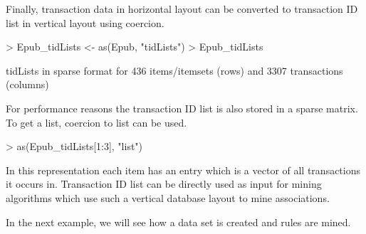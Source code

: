 \documentclass[10pt,a4paper]{article}
\newcommand{\class}[1]{\textsf{#1}}
\begin{document}
Finally, transaction data in horizontal layout can be converted to
transaction ID list in vertical layout using coercion.

\begin{Schunk}
\begin{Sinput}
> Epub_tidLists <- as(Epub, "tidLists")
> Epub_tidLists
\end{Sinput}
\begin{Soutput}
tidLists in sparse format for
 436 items/itemsets (rows) and
 3307 transactions (columns)

\end{Soutput}
\end{Schunk}

For performance reasons the transaction ID list
is also stored in a sparse matrix. To get a list, coercion to \class{list}
can be used.

\begin{Schunk}
\begin{Sinput}
> as(Epub_tidLists[1:3], "list")
\end{Sinput}
\end{Schunk}

In this representation each item has an entry
which is a vector of all transactions it occurs in.
Transaction ID list can be directly used as input for mining algorithms which 
use such a vertical database layout to mine associations.

In the next example, we will see how a data set is created and
rules are mined.
\end{document}
